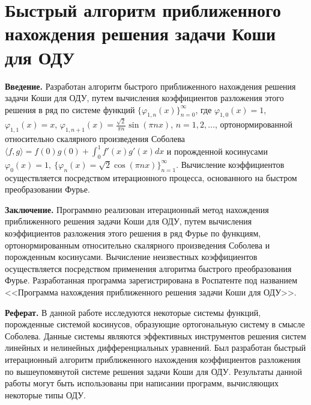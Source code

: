
\section{Быстрый алгоритм приближенного нахождения решения задачи Коши для ОДУ}



\textbf{ Введение.} Разработан алгоритм быстрого приближенного нахождения решения задачи Коши для ОДУ, путем вычисления коэффициентов разложения этого решения в ряд по системе функций $\{\varphi_{1,n}(x)\}_{n=0}^{\infty}$, где $ \varphi_{1,0}(x)=1$, $\varphi_{1,1}(x)=x$, $\varphi_{1,n+1}(x)=\frac{\sqrt{2}}{\pi n}\sin(\pi nx)$, $n=1,2,\ldots$,
ортонормированной относительно скалярного произведения Соболева $\langle f, g\rangle=f(0)g(0)+\int_0^1f'(x)g'(x)dx$ и порожденной
косинусами $\varphi_0(x)=1,\ \{\varphi_n(x)=\sqrt{2}\cos(\pi nx)\}_{n=1}^\infty$.
Вычисление коэффициентов осуществляется посредством итерационного процесса, основанного на быстром преобразовании Фурье.

\textbf{ Заключение.} Программно реализован итерационный метод нахождения приближенного решения задачи Коши для ОДУ, путем вычисления коэффициентов разложения этого решения в ряд Фурье по функциям, ортонормированным
относительно скалярного произведения Соболева и порожденным косинусами.
Вычисление неизвестных коэффициентов осуществляется посредством применения алгоритма быстрого преобразования Фурье. Разработанная программа зарегистрирована в Роспатенте под названием <<Программа нахождения приближенного решения задачи Коши для ОДУ>>.

\textbf{Реферат.} В данной работе исследуются некоторые системы функций, порожденные системой косинусов, образующие ортогональную систему в смысле Соболева. Данные системы являются эффективных инструментов решения систем линейных и нелинейных
дифференциальных уравнений.
Был разработан быстрый итерационный алгоритм приближенного нахождения коэффициентов разложения по вышеупомянутой системе
решения задачи Коши для ОДУ. Результаты данной работы могут быть использованы при написании программ, вычисляющих некоторые
типы ОДУ.

